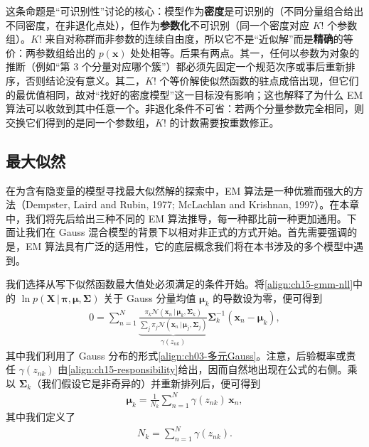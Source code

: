 \documentclass[../../main.tex]{subfiles}
\begin{document}
\begin{remark}
这条命题是“可识别性”讨论的核心：模型作为\textbf{密度}是可识别的（不同分量组合给出不同密度，在非退化点处），但作为\textbf{参数化}不可识别（同一个密度对应 $K!$ 个参数组）。$K!$ 来自对称群而非参数的连续自由度，所以它不是“近似解”而是\textbf{精确}的等价：两参数组给出的 $p(\bm{x})$ 处处相等。后果有两点。其一，任何以参数为对象的推断（例如“第 3 个分量对应哪个簇”）都必须先固定一个规范次序或事后重新排序，否则结论没有意义。其二，$K!$ 个等价解使似然函数的驻点成倍出现，但它们的最优值相同，故对“找好的密度模型”这一目标没有影响；这也解释了为什么 EM 算法可以收敛到其中任意一个。非退化条件不可省：若两个分量参数完全相同，则交换它们得到的是同一个参数组，$K!$ 的计数需要按重数修正。
\end{remark}

\subsection{最大似然}\label{subsection:ch15-最大似然}

在为含有隐变量的模型寻找最大似然解的探索中，EM 算法是一种优雅而强大的方法（Dempster, Laird and Rubin, 1977; McLachlan and Krishnan, 1997）。在本章中，我们将先后给出三种不同的 EM 算法推导，每一种都比前一种更加通用。下面让我们在 Gauss 混合模型的背景下以相对非正式的方式开始。首先需要强调的是，EM 算法具有广泛的适用性，它的底层概念我们将在本书涉及的多个模型中遇到。

我们选择从写下似然函数最大值处必须满足的条件开始。将\eqref{align:ch15-gmm-nll}中的 $\ln p(\bm{X}\,|\,\bm{\pi},\bm{\mu},\bm{\Sigma})$ 关于 Gauss 分量均值 $\bm{\mu}_k$ 的导数设为零，便可得到
\begin{align}
0=\sum_{n=1}^{N}\underbrace{\frac{\pi_k\mathcal{N}(\bm{x}_n\,|\,\bm{\mu}_k,\bm{\Sigma}_k)}{\sum_j\pi_j\mathcal{N}(\bm{x}_n\,|\,\bm{\mu}_j,\bm{\Sigma}_j)}}_{\gamma(z_{nk})}\bm{\Sigma}_k^{-1}(\bm{x}_n-\bm{\mu}_k),
\label{align:ch15-mu-deriv}
\end{align}
其中我们利用了 Gauss 分布的形式\eqref{align:ch03-多元Gauss}。注意，后验概率或责任 $\gamma(z_{nk})$ 由\eqref{align:ch15-responsibility}给出，因而自然地出现在公式的右侧。乘以 $\bm{\Sigma}_k$（我们假设它是非奇异的）并重新排列后，便可得到
\begin{align}
\bm{\mu}_k=\frac{1}{N_k}\sum_{n=1}^{N}\gamma(z_{nk})\,\bm{x}_n,
\label{align:ch15-mu-update}
\end{align}
其中我们定义了
\begin{align}
N_k=\sum_{n=1}^{N}\gamma(z_{nk}).
\label{align:ch15-effective-n}
\end{align}
\end{document}

